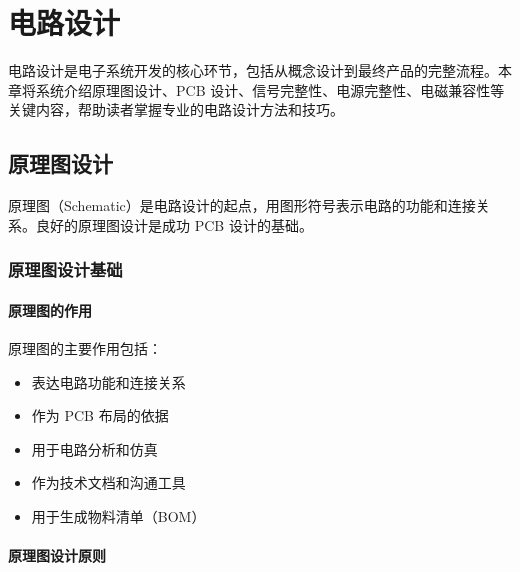 \chapter{电路设计}

电路设计是电子系统开发的核心环节，包括从概念设计到最终产品的完整流程。本章将系统介绍原理图设计、PCB 设计、信号完整性、电源完整性、电磁兼容性等关键内容，帮助读者掌握专业的电路设计方法和技巧。

\section{原理图设计}

原理图（Schematic）是电路设计的起点，用图形符号表示电路的功能和连接关系。良好的原理图设计是成功 PCB 设计的基础。

\subsection{原理图设计基础}

\subsubsection{原理图的作用}

原理图的主要作用包括：
\begin{itemize}
  \item 表达电路功能和连接关系
  \item 作为 PCB 布局的依据
  \item 用于电路分析和仿真
  \item 作为技术文档和沟通工具
  \item 用于生成物料清单（BOM）
\end{itemize}

\subsubsection{原理图设计原则}

